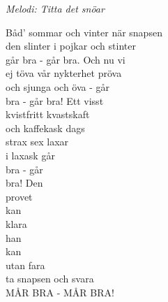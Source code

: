 {\footnotesize\textit{Melodi: Titta det snöar}}\par
\vspace{3pt}
\begin{center}
  Båd' sommar och vinter när snapsen\\
  den slinter i pojkar och stinter\\
  går bra - går bra. Och nu vi\\
  ej töva vår nykterhet pröva\\
  och sjunga och öva - går\\
  bra - går bra! Ett visst\\
  kvistfritt kvastskaft\\
  och kaffekask dags\\
  strax sex laxar\\
  i laxask går\\
  bra - går\\
  bra! Den\\
  provet\\
  kan\\
  klara\\
  han\\
  kan\\
  utan fara\\
  ta snapsen och svara\\
  MÅR BRA - MÅR BRA!
\end{center}
